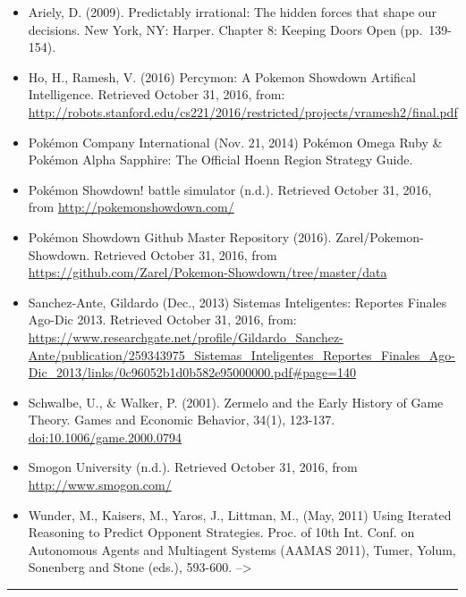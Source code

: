 \documentclass[12pt,twoside]{reedthesis}
\providecommand{\tightlist}{%
  \setlength{\itemsep}{0pt}\setlength{\parskip}{0pt}}
\begin{document}
  \begin{itemize}
  \tightlist
  \item
    Ariely, D. (2009). Predictably irrational: The hidden forces that
    shape our decisions. New York, NY: Harper. Chapter 8: Keeping Doors
    Open (pp.~139-154).
  \item
    Ho, H., Ramesh, V. (2016) Percymon: A Pokemon Showdown Artifical
    Intelligence. Retrieved October 31, 2016, from:
    \url{http://robots.stanford.edu/cs221/2016/restricted/projects/vramesh2/final.pdf}
  \item
    Pokémon Company International (Nov. 21, 2014) Pokémon Omega Ruby \&
    Pokémon Alpha Sapphire: The Official Hoenn Region Strategy Guide.
  \item
    Pokémon Showdown! battle simulator (n.d.). Retrieved October 31, 2016,
    from \url{http://pokemonshowdown.com/}
  \item
    Pokémon Showdown Github Master Repository (2016).
    Zarel/Pokemon-Showdown. Retrieved October 31, 2016, from
    \url{https://github.com/Zarel/Pokemon-Showdown/tree/master/data}
  \item
    Sanchez-Ante, Gildardo (Dec., 2013) Sistemas Inteligentes: Reportes
    Finales Ago-Dic 2013. Retrieved October 31, 2016, from:
    \url{https://www.researchgate.net/profile/Gildardo_Sanchez-Ante/publication/259343975_Sistemas_Inteligentes_Reportes_Finales_Ago-Dic_2013/links/0c96052b1d0b582e95000000.pdf\#page=140}
  \item
    Schwalbe, U., \& Walker, P. (2001). Zermelo and the Early History of
    Game Theory. Games and Economic Behavior, 34(1), 123-137.
    \url{doi:10.1006/game.2000.0794}
  \item
    Smogon University (n.d.). Retrieved October 31, 2016, from
    \url{http://www.smogon.com/}
  \item
    Wunder, M., Kaisers, M., Yaros, J., Littman, M., (May, 2011) Using
    Iterated Reasoning to Predict Opponent Strategies. Proc. of 10th Int.
    Conf. on Autonomous Agents and Multiagent Systems (AAMAS 2011), Tumer,
    Yolum, Sonenberg and Stone (eds.), 593-600. --\textgreater{} \noindent
  \end{itemize}
  
  \setlength{\parindent}{-0.20in} \setlength{\leftskip}{0.20in}
  \setlength{\parskip}{8pt}
  
  \begin{center}\rule{0.5\linewidth}{\linethickness}\end{center}


\end{document}
